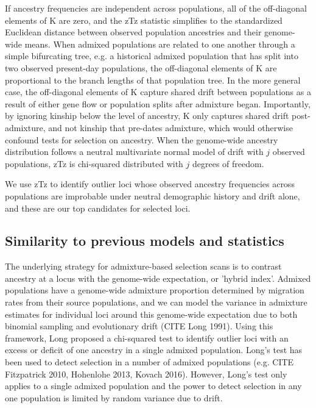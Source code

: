\documentclass[12pt]{report}
\begin{document}
If ancestry frequencies are independent across populations, all of the off-diagonal elements of K are zero, and the zTz statistic simplifies to the standardized Euclidean distance between observed population ancestries and their genome-wide means. When admixed populations are related to one another through a simple bifurcating tree, e.g. a historical admixed population that has split into two observed present-day populations, the off-diagonal elements of K are proportional to the branch lengths of that population tree. In the more general case, the off-diagonal elements of K capture shared drift between populations as a result of either gene flow or population splits after admixture began. Importantly, by ignoring kinship below the level of ancestry, K only captures shared drift post-admixture, and not kinship that pre-dates admixture, which would otherwise confound tests for selection on ancestry. When the genome-wide ancestry distribution follows a neutral multivariate normal model of drift with $j$ observed populations, zTz is chi-squared distributed with $j$ degrees of freedom. 

We use zTz to identify outlier loci whose observed ancestry frequencies across populations are improbable under neutral demographic history and drift alone, and these are our top candidates for selected loci. 

\subsection{Similarity to previous models and statistics}

The underlying strategy for admixture-based selection scans is to contrast ancestry at a locus with the genome-wide expectation, or 'hybrid index'. Admixed populations have a genome-wide admixture proportion determined by migration rates from their source populations, and we can model the variance in admixture estimates for individual loci around this genome-wide expectation due to both binomial sampling and evolutionary drift (CITE Long 1991). Using this framework, Long proposed a chi-squared test to identify outlier loci with an excess or deficit of one ancestry in a single admixed population. Long's test has been used to detect selection in a number of admixed populations (e.g. CITE Fitzpatrick 2010, Hohenlohe 2013, Kovach 2016). However, Long's test only applies to a single admixed population and the power to detect selection in any one population is limited by random variance due to drift. 
\end{document}
